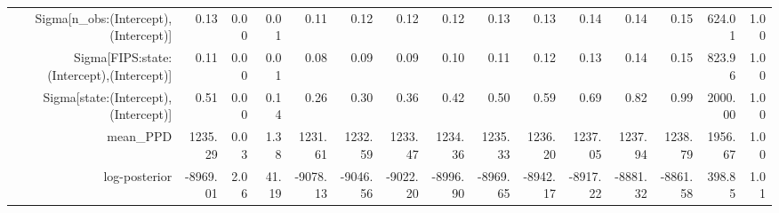 \begin{table}[ht]
\begin{tabular}{rrrrrrrrrrrrrrr}
  Sigma[n\_obs:(Intercept),(Intercept)] & 0.13 & 0.00 & 0.01 & 0.11 & 0.12 & 0.12 & 0.12 & 0.13 & 0.13 & 0.14 & 0.14 & 0.15 & 624.01 & 1.00 \\ 
  Sigma[FIPS:state:(Intercept),(Intercept)] & 0.11 & 0.00 & 0.01 & 0.08 & 0.09 & 0.09 & 0.10 & 0.11 & 0.12 & 0.13 & 0.14 & 0.15 & 823.96 & 1.00 \\ 
  Sigma[state:(Intercept),(Intercept)] & 0.51 & 0.00 & 0.14 & 0.26 & 0.30 & 0.36 & 0.42 & 0.50 & 0.59 & 0.69 & 0.82 & 0.99 & 2000.00 & 1.00 \\ 
  mean\_PPD & 1235.29 & 0.03 & 1.38 & 1231.61 & 1232.59 & 1233.47 & 1234.36 & 1235.33 & 1236.20 & 1237.05 & 1237.94 & 1238.79 & 1956.67 & 1.00 \\ 
  log-posterior & -8969.01 & 2.06 & 41.19 & -9078.13 & -9046.56 & -9022.20 & -8996.90 & -8969.65 & -8942.17 & -8917.22 & -8881.32 & -8861.58 & 398.85 & 1.01 \\ 
   \hline
\end{tabular}
\end{table}
